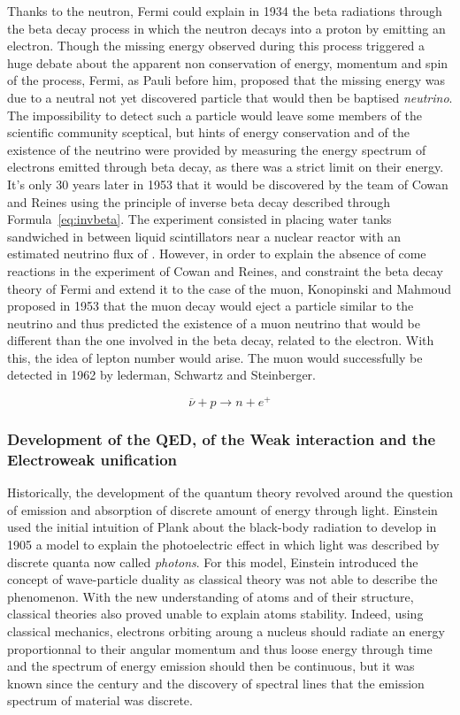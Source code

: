 	Thanks to the neutron, Fermi could explain in 1934 the beta radiations through the beta decay process in which the neutron decays into a proton by emitting an electron. Though the missing energy observed during this process triggered a huge debate about the apparent non conservation of energy, momentum and spin of the process, Fermi, as Pauli before him, proposed that the missing energy was due to a neutral not yet discovered particle that would then be baptised \textit{neutrino}. The impossibility to detect such a particle would leave some members of the scientific community sceptical, but hints of energy conservation and of the existence of the neutrino were provided by measuring the energy spectrum of electrons emitted through beta decay, as there was a strict limit on their energy. It's only 30 years later in 1953 that it would be discovered by the team of Cowan and Reines using the principle of inverse beta decay described through Formula~\ref{eq:invbeta}. The experiment consisted in placing water tanks sandwiched in between liquid scintillators near a nuclear reactor with an estimated neutrino flux of \siflux. However, in order to explain the absence of come reactions in the experiment of Cowan and Reines, and constraint the beta decay theory of Fermi and extend it to the case of the muon, Konopinski and Mahmoud proposed in 1953 that the muon decay would eject a particle similar to the neutrino and thus predicted the existence of a muon neutrino that would be different than the one involved in the beta decay, related to the electron. With this, the idea of lepton number would arise. The muon would successfully be detected in 1962 by lederman, Schwartz and Steinberger.
	
	\begin{equation}
		\label{eq:invbeta}
		\overline{\nu} + p \rightarrow n + e^+
	\end{equation}
	
	\subsubsection*{Development of the \acl{QED}, of the Weak interaction and the Electroweak unification}
	\label{chapt2:sssec:QED}
	
	Historically, the development of the quantum theory revolved around the question of emission and absorption of discrete amount of energy through light. Einstein used the initial intuition of Plank about the black-body radiation to develop in 1905 a model to explain the photoelectric effect in which light was described by discrete quanta now called \textit{photons}. For this model, Einstein introduced the concept of wave-particle duality as classical theory was not able to describe the phenomenon. With the new understanding of atoms and of their structure, classical theories also proved unable to explain atoms stability. Indeed, using classical mechanics, electrons orbiting aroung a nucleus should radiate an energy proportionnal to their angular momentum and thus loose energy through time and the spectrum of energy emission should then be continuous, but it was known since the  century and the discovery of spectral lines that the emission spectrum of material was discrete.
	

